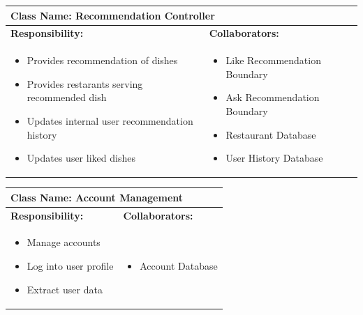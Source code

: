 \documentclass[]{article}
\begin{document}
\begin{table}[H]
	\centering
	\begin{tabular}{|p{7cm}|p{7cm}|}
	\hline 
	 \multicolumn{2}{|l|}{\textbf{Class Name: Recommendation Controller}} \\
	\hline
	\textbf{Responsibility:} & \textbf{Collaborators:} \\
	\hline
	\raggedright
	\begin{itemize}
		\item Provides recommendation of dishes
		\item  Provides restarants serving recommended dish
		\item Updates internal user recommendation history
		\item Updates user liked dishes
	\end{itemize}
	\vspace{1in} & 
	\begin{itemize}
		\item Like Recommendation Boundary
		\item Ask Recommendation Boundary
		\item Restaurant Database
		\item User History Database
	\end{itemize} \\
	\hline
	\end{tabular}
\end{table}

\begin{table}[H]
	\centering
	\begin{tabular}{|p{7cm}|p{7cm}|}
	\hline 
	 \multicolumn{2}{|l|}{\textbf{Class Name: Account Management}} \\
	\hline
	\textbf{Responsibility:} & \textbf{Collaborators:} \\
	\hline
	\raggedright
	\begin{itemize}
		\item Manage accounts
		\item Log into user profile
		\item Extract user data
	\end{itemize}
	\vspace{1in} & 
	\begin{itemize}
		\item Account Database
	\end{itemize} \\
	\hline
	\end{tabular}
\end{table}
\end{document}
